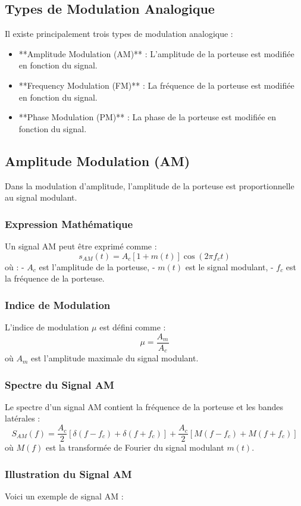 \documentclass[10pt,a4paper]{article}
\begin{document}
\subsection*{Types de Modulation Analogique}
Il existe principalement trois types de modulation analogique :
\begin{itemize}
    \item **Amplitude Modulation (AM)** : L'amplitude de la porteuse est modifiée en fonction du signal.
    \item **Frequency Modulation (FM)** : La fréquence de la porteuse est modifiée en fonction du signal.
    \item **Phase Modulation (PM)** : La phase de la porteuse est modifiée en fonction du signal.
\end{itemize}

\subsection*{Amplitude Modulation (AM)}
Dans la modulation d'amplitude, l'amplitude de la porteuse est proportionnelle au signal modulant.

\subsubsection*{Expression Mathématique}
Un signal AM peut être exprimé comme :
\[ s_{AM}(t) = A_c \left[1 + m(t)\right] \cos(2\pi f_c t) \]
où :
- \( A_c \) est l'amplitude de la porteuse,
- \( m(t) \) est le signal modulant,
- \( f_c \) est la fréquence de la porteuse.

\subsubsection*{Indice de Modulation}
L'indice de modulation \( \mu \) est défini comme :
\[ \mu = \frac{A_m}{A_c} \]
où \( A_m \) est l'amplitude maximale du signal modulant.

\subsubsection*{Spectre du Signal AM}
Le spectre d'un signal AM contient la fréquence de la porteuse et les bandes latérales :
\[ S_{AM}(f) = \frac{A_c}{2} \left[ \delta(f - f_c) + \delta(f + f_c) \right] + \frac{A_c}{2} \left[ M(f - f_c) + M(f + f_c) \right] \]
où \( M(f) \) est la transformée de Fourier du signal modulant \( m(t) \).

\subsubsection*{Illustration du Signal AM}
Voici un exemple de signal AM :
\end{document}
